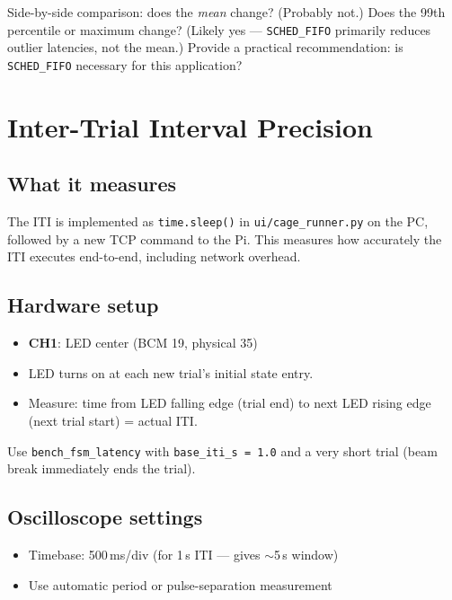 \documentclass[11pt, a4paper]{article}
\begin{document}
Side-by-side comparison: does the \emph{mean} change? (Probably not.)
Does the 99th percentile or maximum change? (Likely yes --- \texttt{SCHED\_FIFO}
primarily reduces outlier latencies, not the mean.) Provide a practical
recommendation: is \texttt{SCHED\_FIFO} necessary for this application?

\newpage

\section{Inter-Trial Interval Precision}

\subsection*{What it measures}

The ITI is implemented as \texttt{time.sleep()} in \texttt{ui/cage\_runner.py}
on the PC, followed by a new TCP command to the Pi. This measures how
accurately the ITI executes end-to-end, including network overhead.

\subsection*{Hardware setup}

\begin{itemize}[noitemsep]
    \item \textbf{CH1}: LED center (BCM 19, physical 35)
    \item LED turns on at each new trial's initial state entry.
    \item Measure: time from LED falling edge (trial end) to next LED rising
          edge (next trial start) = actual ITI.
\end{itemize}

Use \texttt{bench\_fsm\_latency} with \texttt{base\_iti\_s = 1.0} and a very
short trial (beam break immediately ends the trial).

\subsection*{Oscilloscope settings}

\begin{itemize}[noitemsep]
    \item Timebase: 500\,ms/div (for 1\,s ITI --- gives $\sim$5\,s window)
    \item Use automatic period or pulse-separation measurement
\end{itemize}
\end{document}
